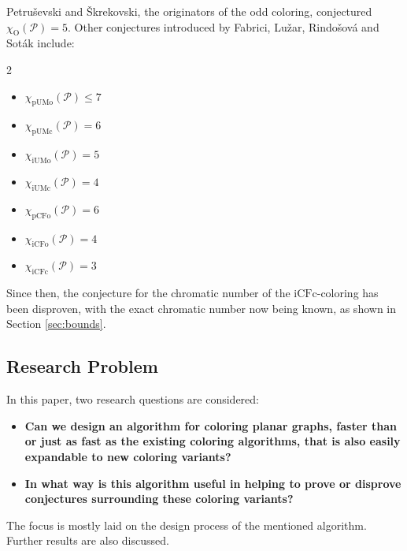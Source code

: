 \documentclass{article}
\begin{document}
Petruševski and Škrekovski, the originators of the odd coloring, conjectured $\chi_{\mathrm{O}}(\mathcal{P}) = 5$. Other conjectures introduced by Fabrici, Lužar, Rindošová and Soták \cite{fabrici2023proper} include:

\begin{minipage}{0.45\textwidth}
	\raggedcolumns
	\begin{multicols}{2}
		\begin{itemize}
			\item $\chi_{\mathrm{pUMo}}(\mathcal{P}) \leq 7$
			\item $\chi_{\mathrm{pUMc}}(\mathcal{P}) = 6$
			\item $\chi_{\mathrm{iUMo}}(\mathcal{P}) = 5$
			\item $\chi_{\mathrm{iUMc}}(\mathcal{P}) = 4$
			\item $\chi_{\mathrm{pCFo}}(\mathcal{P}) = 6$
			\item $\chi_{\mathrm{iCFo}}(\mathcal{P}) = 4$
			\item $\chi_{\mathrm{iCFc}}(\mathcal{P}) = 3$
		\end{itemize}
	\end{multicols}
\end{minipage}
\vspace{0.4cm}

Since then, the conjecture for the chromatic number of the $\mathrm{iCFc}$-coloring has been disproven, with the exact chromatic number now being known, as shown in Section \ref{sec:bounds}.


\subsection{Research Problem}

In this paper, two research questions are considered:

\begin{itemize}
	\item \textbf{Can we design an algorithm for coloring planar graphs, faster than or just as fast as the existing coloring algorithms, that is also easily expandable to new coloring variants?}
	\item \textbf{In what way is this algorithm useful in helping to prove or disprove conjectures surrounding these coloring variants?}
\end{itemize}

The focus is mostly laid on the design process of the mentioned algorithm. Further results are also discussed.
\end{document}
